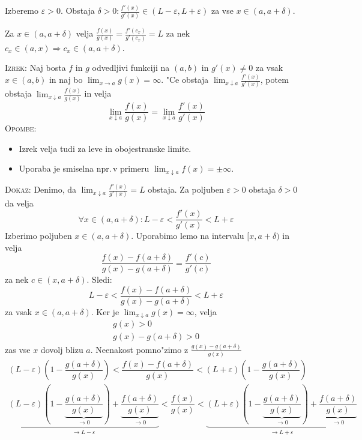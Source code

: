 Izberemo $\varepsilon > 0$. Obstaja $\delta > 0: \frac{f'(x)}{g'(x)} \in (L - \varepsilon, L + \varepsilon)$ za vse $x \in (a, a+ \delta)$.

Za $x \in (a, a+ \delta)$ velja $\frac{f(x)}{g(x)} = \frac{f'(c_x)}{g'(c_x)} = L$ za nek $c_x \in (a, x) \Rightarrow c_x \in (a, a + \delta)$.

\textsc{Izrek:} Naj bosta $f$ in $g$ odvedljivi funkciji na $(a, b)$ in $g'(x) \neq 0$ za vsak $x \in (a, b)$ in naj bo $\lim_{x \to a}g(x) = \infty$. "Ce obstaja $\lim_{x \downarrow a} \frac{f'(x)}{g'(x)}$, potem obstaja $\lim_{x \downarrow a} \frac{f(x)}{g(x)}$ in velja
\begin{equation*}
\lim_{x \downarrow a} \dfrac{f(x)}{g(x)} = \lim_{x \downarrow a} \dfrac{f'(x)}{g'(x)}
\end{equation*}
\textsc{Opombe:}
\begin{itemize}
	\item Izrek velja tudi za leve in obojestranske limite.
	\item Uporaba je smiselna npr.\,v primeru $\lim_{x \downarrow a} f(x) = \pm \infty$.
\end{itemize}
\textsc{Dokaz:} Denimo, da $\lim_{x \downarrow a} \frac{f'(x)}{g'(x)} = L$ obstaja. Za poljuben $\varepsilon > 0$ obstaja $\delta > 0$ da velja
\begin{equation*}
\forall x \in (a, a + \delta): L - \varepsilon < \dfrac{f'(x)}{g'(x)} < L + \varepsilon
\end{equation*}
Izberimo poljuben $x \in (a, a + \delta)$. Uporabimo lemo na intervalu $[x, a + \delta)$ in velja
\begin{equation*}
\dfrac{f(x) - f(a + \delta)}{g(x) - g(a + \delta)} = \dfrac{f'(c)}{g'(c)}
\end{equation*}
za nek $c \in (x, a + \delta)$. Sledi:
\begin{equation*}
L - \varepsilon < \dfrac{f(x) - f(a + \delta)}{g(x) - g(a + \delta)} < L + \varepsilon
\end{equation*}
za vsak $x \in (a, a + \delta)$. Ker je $\lim_{x \downarrow a} g(x) = \infty$, velja
\begin{gather*}
g(x) > 0 \\
g(x) - g(a + \delta) > 0
\end{gather*}
zas vse $x$ dovolj blizu $a$. Neenakost pomno"zimo z $\frac{g(x) - g(a + \delta)}{g(x)}$
\begin{gather*}
(L - \varepsilon) \left( 1 - \dfrac{g(a + \delta)}{g(x)} \right) < \dfrac{f(x) - f(a + \delta)}{g(x)} < (L + \varepsilon) \left( 1 - \dfrac{g(a + \delta)}{g(x)} \right) \\
\underbrace{(L - \varepsilon) \left( 1 - \underbrace{\dfrac{g(a + \delta)}{g(x)}}_{\to 0} \right) + \underbrace{\dfrac{f(a + \delta)}{g(x)}}_{\to 0}}_{\to L - \varepsilon} < \dfrac{f(x)}{g(x)} < \underbrace{(L + \varepsilon) \left( 1 - \underbrace{\dfrac{g(a + \delta)}{g(x)}}_{\to 0} \right) + \underbrace{\dfrac{f(a + \delta)}{g(x)}}_{\to 0}}_{\to L + \varepsilon}
\end{gather*}

